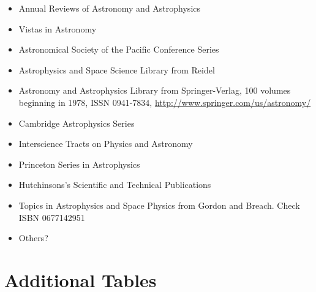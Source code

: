 \documentclass{article}
\begin{document}
\begin{itemize}
  \item Annual Reviews of Astronomy and Astrophysics
  \item Vistas in Astronomy
  \item Astronomical Society of the Pacific Conference Series
  \item Astrophysics and Space Science Library from Reidel
  \item Astronomy and Astrophysics Library from Springer-Verlag, 100 volumes beginning in 1978, ISSN 0941-7834, \url{http://www.springer.com/us/astronomy/}
  \item Cambridge Astrophysics Series
  \item Interscience Tracts on Physics and Astronomy
  \item Princeton Series in Astrophysics
  \item Hutchinsons's Scientific and Technical Publications
  \item Topics in Astrophysics and Space Physics from Gordon and Breach. Check ISBN 0677142951
  \item Others?
\end{itemize}

\section{Additional Tables}


\end{document}

